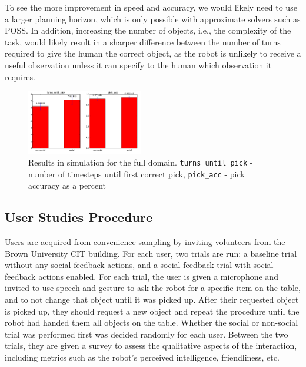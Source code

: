 \documentclass{article}
\begin{document}
\begin{multicols}{2}
To see the more improvement in speed and accuracy, we would likely need to use a larger planning horizon, which is only possible with approximate solvers such as POSS. In addition, increasing the number of objects, i.e., the complexity of the task, would likely result in a sharper difference between the number of turns required to give the human the correct object, as the robot is unlikely to receive a useful observation unless it can specify to the human which observation it requires. 



\begin{figure}[H]
\begin{center}
	\includegraphics[width=0.45\textwidth]{full_results}
\end{center}
\caption{Results in simulation for the full domain. \texttt{turns\_until\_pick} - number of timesteps until first correct pick,  \texttt{pick\_acc} - pick accuracy as a percent}
	\label{fig:results}
\end{figure}

\subsection{User Studies Procedure}

Users are acquired from convenience sampling by inviting volunteers from the Brown University CIT building. For each user, two trials are run: a baseline trial without any social feedback actions, and a social-feedback trial with social feedback actions enabled. For each trial, the user is given a microphone and invited to use speech and gesture to ask the robot for a specific item on the table, and to not change that object until it was picked up. After their requested object is picked up, they should request a new object and repeat the procedure until the robot had handed them all objects on the table. Whether the social or non-social trial was performed first was decided randomly for each user. Between the two trials, they are given a survey to assess the qualitative aspects of the interaction, including metrics such as the robot's perceived intelligence, friendliness, etc. 


\end{multicols}
\end{document}
